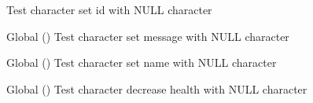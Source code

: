 \begin{DoxyRefList}
%
Test character set id with NULL character  
\item[Global \doxylink{character__test_8c_afae2256c79ebaf31b7402307dad69253}{test2\+\_\+character\+\_\+set\+\_\+message} ()]\label{test__test000027}%
%
Test character set message with NULL character  
\item[Global \doxylink{character__test_8c_a74b160bc91661973b864acec8b9a16ce}{test2\+\_\+character\+\_\+set\+\_\+name} ()]\label{test__test000009}%
%
Test character set name with NULL character  
\item[Global \doxylink{player__test_8c_a8c0cb9c6989aa43c2e38c120a6644250}{test2\+\_\+decrease\+\_\+health} ()]\label{test__test000019}%
%
Test character decrease health with NULL character 


\end{DoxyRefList}
